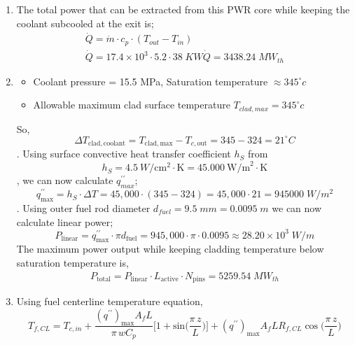 \documentclass[12pt]{article}
\begin{document}
\begin{enumerate}
    \item The total power that can be extracted from this PWR core while keeping the coolant subcooled at the exit is;
\begin{equation}
    \begin{gathered}
        \dot{Q} = \dot{m} \cdot c_p \cdot (T_{out} - T_{in}) \\
        \dot{Q} = 17.4 \times 10^3 \cdot 5.2 \cdot 38 \; KW
        \dot{Q} = \boxed{3438.24 \;MW_{th}}
    \end{gathered}
\end{equation}

\item \begin{itemize}
    \item Coolant pressure = 15.5 MPa, Saturation temperature $\approx 345 ^{\circ} c$
    \item Allowable maximum clad surface temperature $T_{clad, max} = 345 ^{\circ} c$
\end{itemize}

So, \[\Delta T_{\mathrm{clad,coolant}}=T_{\mathrm{clad, max}}-T_{c,\mathrm{out}}=345-324=21^{\circ}C\]. Using surface convective heat transfer coefficient $h_S$ from \cite{popov2017th} \[h_S = 4.5\ W/{\mathrm{cm}}^{2}\cdot\mathrm{K}=45.000\ \mathrm{W/m}^{2}\cdot\mathrm{K}\], we can now calculate $q^{\prime \prime}_{max}$; \[q_{\mathrm{max}}^{\prime\prime}=h_S\cdot\Delta T=45,000\cdot(345-324)=45,000\cdot21 = 945000 \; W/m^2\]. Using outer fuel rod diameter $d_{fuel} = 9.5 \; mm = 0.0095 \; m$ we can now calculate linear power; \[P_{\mathrm{linear}}=q_{\mathrm{max}}^{\prime \prime}\cdot\pi d_{\mathrm{fuel}}=945,000\cdot\pi\cdot0.0095\approx 28.20 \times 10^3 \; W/m\] The maximum power output while keeping cladding temperature below saturation temperature is,
\begin{equation}
    \begin{gathered}
        P_{\mathrm{total}}=P_{\mathrm{linear}}\cdot L_{\mathrm{active}}\cdot N_{\mathrm{pins}} = \boxed{5259.54 \; MW_{th}}
    \end{gathered}
\end{equation}

\item Using fuel centerline temperature equation, 
\begin{equation*}
    T_{f,C L}=T_{c,i n}+\frac{\left(q^{\prime \prime}\right)_{\mathrm{max}}A_{f}L}{\pi\,w C_{p}}\Bigg[1+\mathrm{sin}\Bigg(\frac{\pi\,z}{L}\Bigg)\Bigg]+\left(q^{\prime \prime}\right)_{\mathrm{max}}A_{f}L R_{f,C L}\cos\Bigg(\frac{\pi\,z}{L}\Bigg)
\end{equation*}


\end{enumerate}
\end{document}

